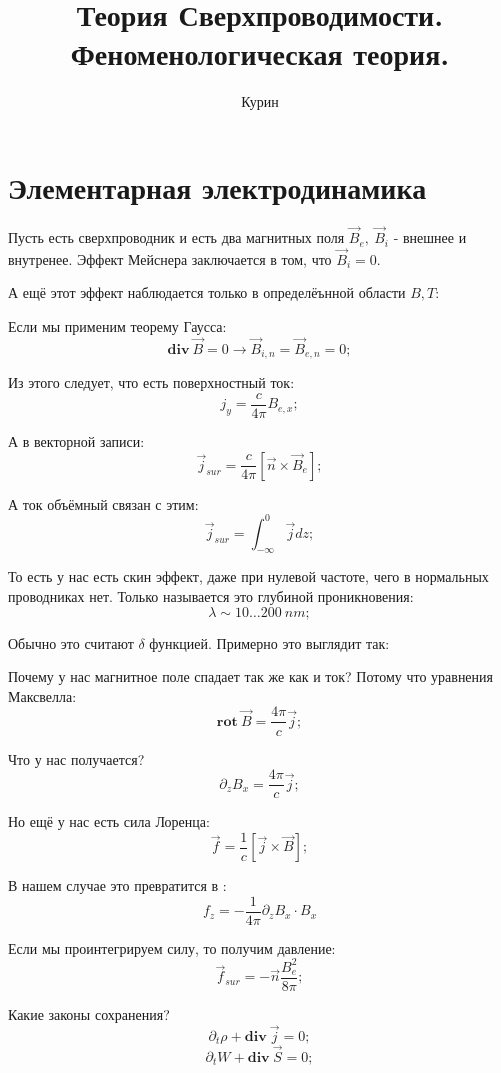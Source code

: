 \documentclass[a4paper, 14pt, russian]{article}
\title{Теория Сверхпроводимости. Феноменологическая теория.}
\author{Курин}
\date{}
\newcommand{\be}{\begin{equation}}
\newcommand{\ee}{\end{equation}}
\newcommand{\pa}{\partial}
\newcommand{\rot}{\textbf{rot}~}
\renewcommand{\div}{\textbf{div}~}
\begin{document}
	\maketitle

	

	\section{Элементарная электродинамика}

	Пусть есть сверхпроводник и есть два магнитных поля 
	$\vec{B}_e,~\vec{B}_i$ - внешнее и внутренее. Эффект 
	Мейснера заключается в том, что $\vec{B}_i = 0$.
	
	А ещё этот эффект наблюдается только в определёънной 
	области $B,T$:


	Если мы применим теорему Гаусса:
	\be
		\div \vec B = 0 \rightarrow \vec{B}_{i,n} = \vec{B}_{e,n} = 0;
	\ee


	Из этого следует, что есть поверхностный ток:
	\be
		j_y = \frac{c}{4\pi} B_{e,x};
	\ee

	А в векторной записи:
	\be
		\vec{j}_{sur} = \frac{c}{4\pi} [\vec n \times \vec{B}_e];
	\ee

	А ток объёмный связан с этим:
	\be
		\vec{j}_{sur} = \int_{-\infty}^{0} \vec j  dz;
	\ee

	То есть у нас есть скин эффект, даже при нулевой частоте, чего 
	в нормальных проводниках нет. Только называется это глубиной проникновения:
	\be
		\lambda \sim 10 \hdots 200~nm;
	\ee

	Обычно это считают $\delta$ функцией. Примерно это выглядит так:

	Почему у нас магнитное поле спадает так же как и ток? Потому что 
	уравнения Максвелла:
	\be
		\rot \vec B = \frac{4\pi}{c} \vec j;
	\ee

	Что у нас получается? 
	\be
		\pa_z B_x = \frac{4\pi}{c} \vec j;
	\ee

	Но ещё у нас есть сила Лоренца:
	\be
		\vec f = \frac{1}{c} [\vec j \times \vec B];
	\ee

	В нашем случае это превратится в :
	\be
		f_z = - \frac{1}{4\pi} \pa_z B_x \cdot B_x
	\ee

	Если мы проинтегрируем силу, то получим давление:
	\be
		\vec{f}_{sur} = - \vec n \frac{B_e^2}{8\pi};
	\ee

	Какие законы сохранения?
	\be
		\pa_t \rho + \div \vec j = 0;
	\ee
	\be
		\pa_t W + \div \vec S = 0;
	\ee
\end{document}
